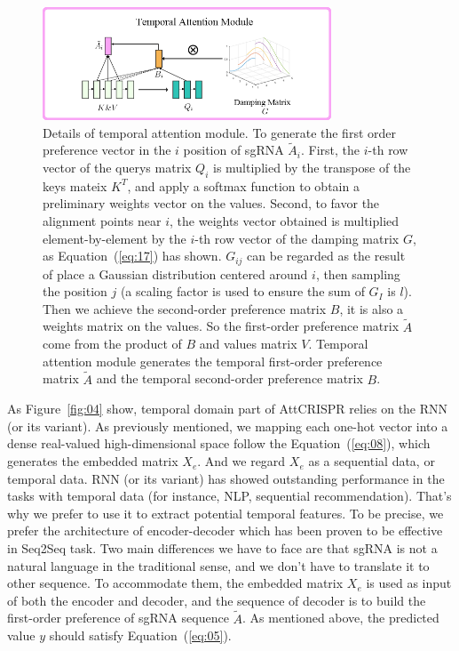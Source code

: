 \documentclass{bioinfo}
\begin{document}
\begin{figure}[tpb]
\centerline{\includegraphics[width=86mm]{temporalattentionmodule.png}}
\caption{        
    Details of temporal attention module. 
    To generate the first order preference vector in the $i$ position of sgRNA $\tilde{A}_i$. 
    First, the $i$-th row vector of the querys matrix $Q_i$ is multiplied by the transpose of the keys mateix $K^T$, and apply a softmax function to obtain a preliminary weights vector on the values. 
    Second, to favor the alignment points near $i$, the weights vector obtained is multiplied element-by-element by the $i$-th row vector of the damping matrix $G$, as Equation~(\ref{eq:17}) has shown. 
    $G_{ij}$ can be regarded as the result of place a Gaussian distribution centered around $i$, then sampling the position $j$ (a scaling factor is used to ensure the sum of $G_I$ is $l$). 
    Then we achieve the second-order preference matrix $B$, it is also a weights matrix on the values. So the first-order preference matrix $\tilde{A}$ come from the product of $B$ and values matrix $V$.
    Temporal attention module generates the temporal first-order preference matrix $\tilde{A}$ and the temporal second-order preference matrix $B$.
    }\label{fig:05}
\end{figure}

As Figure~\ref{fig:04} show, temporal domain part of AttCRISPR relies on the RNN (or its variant). 
As previously mentioned, we mapping each one-hot vector into a dense real-valued high-dimensional space follow the Equation~(\ref{eq:08}), which generates the embedded matrix $X_e$.
And we regard $X_{e}$ as a sequential data, or temporal data.
RNN (or its variant) has showed outstanding performance in the tasks with temporal data (for instance, NLP, sequential recommendation). 
That's why we prefer to use it to extract potential temporal features. 
To be precise, we prefer the architecture of encoder-decoder which has been proven to be effective in Seq2Seq task. 
Two main differences we have to face are that sgRNA is not a natural language in the traditional sense, and we don't have to translate it to other sequence. 
To accommodate them, the embedded matrix $X_e$ is used as input of both the encoder and decoder, and the sequence of decoder is to build the first-order preference of sgRNA sequence $\tilde{A}$. 
As mentioned above, the predicted value $y$ should satisfy Equation~(\ref{eq:05}). 
\end{document}
